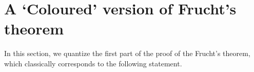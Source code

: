 \documentclass[12pt]{amsart}
\newtheorem{lem}[thm]{Lemma}
\theoremstyle{definition}
\theoremstyle{definition}
\theoremstyle{definition}
\theoremstyle{definition}
\newcommand{\G}{\mathbb{G}}
\numberwithin{equation}{section}
\begin{document}

\section{A `Coloured' version of Frucht's theorem} \label{sec:coloured-Frucht}





In this section, we quantize the first part of the proof of the Frucht's theorem, which classically corresponds to the following statement.
\end{document}
